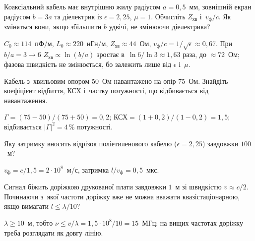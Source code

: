 \begin{problem}\label{prb:CoaxGeometry}
	Коаксіальний кабель має внутрішню жилу радіусом $a = 0{,}5$~мм, зовнішній екран радіусом $b = 3a$ та діелектрик із
	$\epsilon = 2{,}25$, $\mu = 1$. Обчисліть $Z_{\text{хв}}$ і~$v_{\text{ф}}/c$. Як зміняться вони, якщо збільшити $b$ удвічі,
	не змінюючи діелектрика?
	\begin{solution}
		$C_0 \approx 114$~пФ/м, $L_0 \approx 220$~нГн/м, $Z_{\text{хв}} \approx 44$~Ом, $v_{\text{ф}}/c = 1/\sqrt\epsilon \approx 0{,}67$. При $b/a = 3 \to 6$ $Z_{\text{хв}} \propto \ln(b/a)$ зростає в~$\ln6/\ln3 \approx 1{,}63$ раза, до $\approx 72$~Ом; фазова швидкість не змінюється, бо залежить лише від $\epsilon$ і~$\mu$.
	\end{solution}
\end{problem}

\begin{problem}\label{prb:Mismatch}
	Кабель з~хвильовим опором $50$~Ом навантажено на опір $75$~Ом. Знайдіть коефіцієнт відбиття, КСХ і~частку потужності, що
	відбивається від навантаження.
	\begin{solution}
		$\Gamma = (75-50)/(75+50) = 0{,}2$; $\text{КСХ} = (1+0{,}2)/(1-0{,}2) = 1{,}5$; відбивається $|\Gamma|^2 = 4\,\%$ потужності.
	\end{solution}
\end{problem}

\begin{problem}\label{prb:CableDelay}
	Яку затримку вносить відрізок поліетиленового кабелю ($\epsilon = 2{,}25$) завдовжки $100$~м?
	\begin{solution}
		$v_{\text{ф}} = c/1{,}5 = 2\cdot10^{8}$~м/с, затримка $l/v_{\text{ф}} = 0{,}5$~мкс.
	\end{solution}
\end{problem}

\begin{problem}\label{prb:PCBTrace}
	Сигнал біжить доріжкою друкованої плати завдовжки $1$~м зі швидкістю $v \approx c/2$. Починаючи з~якої частоти доріжку вже
	не можна вважати квазістаціонарною, якщо вимагати $l \leqslant \lambda/10$?
	\begin{solution}
		$\lambda \geqslant 10$~м, тобто $\nu \leqslant v/\lambda = 1{,}5\cdot10^{8}/10 = 15$~МГц; на вищих частотах доріжку треба розглядати як довгу лінію.
	\end{solution}
\end{problem}

